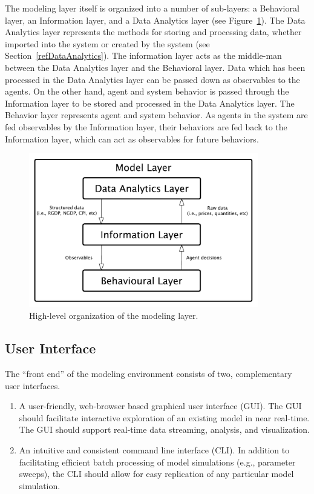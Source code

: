 \documentclass[a4paper]{article}
\begin{document}
The modeling layer itself is organized into a number of sub-layers: a Behavioral layer, an Information layer, and a Data Analytics layer (see Figure~\ref{img-figure-2}). The Data Analytics layer represents the methods for storing and processing data, whether imported into the system or created by the system (see Section~\ref{refDataAnalytics}). The information layer acts as the middle-man between the Data Analytics layer and the Behavioral layer. Data which has been processed in the Data Analytics layer can be passed down as observables to the agents. On the other hand, agent and system behavior is passed through the Information layer to be stored and processed in the Data Analytics layer. The Behavior layer represents agent and system behavior. As agents in the system are fed observables by the Information layer, their behaviors are fed back to the Information layer, which can act as observables for future behaviors.

\begin{figure}
\centering
\includegraphics[width=10cm]{img/coarse-grain-model-layer.pdf}
\caption{High-level organization of the modeling layer.}
\label{img-figure-2}
\end{figure}

\subsection{User Interface}

The ``front end'' of the modeling environment consists of two, complementary user interfaces.

\begin{enumerate}
    \item A user-friendly, web-browser based graphical user interface (GUI). The GUI should facilitate interactive exploration of an existing model in near real-time.  The GUI should support real-time data streaming, analysis, and visualization.
    \item An intuitive and consistent command line interface (CLI). In addition to facilitating efficient batch processing of model simulations (e.g., parameter sweeps), the CLI should allow for easy replication of any particular model simulation.
\end{enumerate}
\end{document}
